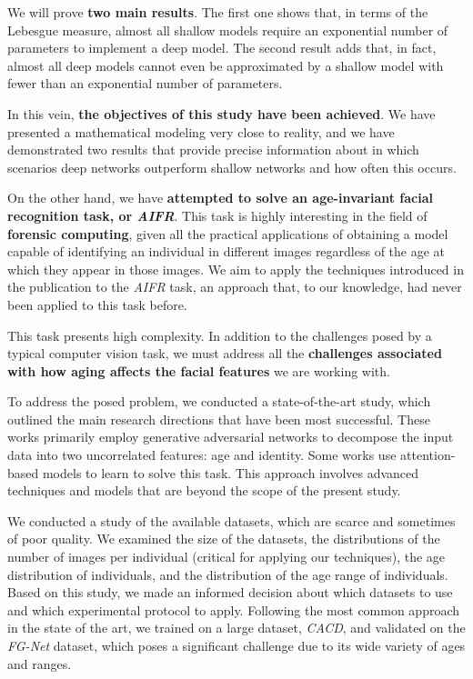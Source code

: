 We will prove \textbf{two main results}. The first one shows that, in terms of the Lebesgue measure, almost all shallow models require an exponential number of parameters to implement a deep model. The second result adds that, in fact, almost all deep models cannot even be approximated by a shallow model with fewer than an exponential number of parameters.

In this vein, \textbf{the objectives of this study have been achieved}. We have presented a mathematical modeling very close to reality, and we have demonstrated two results that provide precise information about in which scenarios deep networks outperform shallow networks and how often this occurs.

On the other hand, we have \textbf{attempted to solve an age-invariant facial recognition task, or \textit{AIFR}}. This task is highly interesting in the field of \textbf{forensic computing}, given all the practical applications of obtaining a model capable of identifying an individual in different images regardless of the age at which they appear in those images. We aim to apply the techniques introduced in the publication \cite{informatica:principal} to the \textit{AIFR} task, an approach that, to our knowledge, had never been applied to this task before.

This task presents high complexity. In addition to the challenges posed by a typical computer vision task, we must address all the \textbf{challenges associated with how aging affects the facial features} we are working with.

To address the posed problem, we conducted a state-of-the-art study, which outlined the main research directions that have been most successful. These works primarily employ generative adversarial networks to decompose the input data into two uncorrelated features: age and identity. Some works use attention-based models to learn to solve this task. This approach involves advanced techniques and models that are beyond the scope of the present study.

We conducted a study of the available datasets, which are scarce and sometimes of poor quality. We examined the size of the datasets, the distributions of the number of images per individual (critical for applying our techniques), the age distribution of individuals, and the distribution of the age range of individuals. Based on this study, we made an informed decision about which datasets to use and which experimental protocol to apply. Following the most common approach in the state of the art, we trained on a large dataset, \textit{CACD}, and validated on the \textit{FG-Net} dataset, which poses a significant challenge due to its wide variety of ages and ranges.

